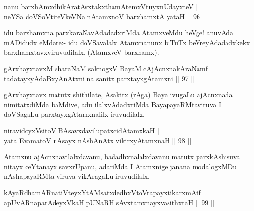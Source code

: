 \begin{shl}
nanu barxhAmxdhikAratAvxtakxthamAtemxVtuyxnUdayxteV |\\
neYSa doVSoV\s tireVkeVNa nA\s \s tamxnoV barxhamxtA yataH \hfill || 96 ||
\end{shl}


\begin{artha}%
idu barxhamxna parxkaraNavAdadadxriMda AtamxveMdu heVge! anuvAda mADidudx eMdare:- idu doVSavalalx Atamxnanunx biTuTx beVreyAdadadxkekx barxhamxtavxviruvudilalx, (AtamxveV barxhamx).
\end{artha}


\begin{shl}
gArxhayxtavxM sharaNaM saknogxV BayaM cAjAcnxnakAraNamf |\\
tadatayxyAdaBxyAnAtxni na sanitx parxtayxgAtamxni \hfill || 97 ||
\end{shl}

\begin{artha}
gArxhayxtavx matutx shithilate, Asakitx (rAga) Baya ivugaLu ajAcnxnada nimitatxdiMda baMdive, adu ilalxvAdadxriMda BayapayaRMtaviruva I doVSagaLu parxtayxgAtamxnalilx iruvudilalx.
\end{artha}


\begin{shl}
niravidoyxV\s \footnotemark[1]{}sitoV BAsavxdavilupatxcidAtamxkaH |\\
yata EvamatoV nAsayx nAshAnAtx vikirxyA\s \s tamxnaH \hfill || 98 ||
\end{shl}

\begin{artha}
Atamxnu ajAcnxnavilalxdavanu, badadhxnalalxdavanu matutx parxkAshisuva nitayx ceYtanayx savxrUpanu, adariMda I Atamxnige janana modalogxMDu nAshapayaRMta viruva vikAragaLu iruvudilalx.
\end{artha}


\begin{shl}
kAyaRdhamARnatiVteyxYtAMsatxdedhxVtoVrapayxtikarxmAtf |\\
apUvARnaparAdeyxVkaH pUNaRH sAvxtamxnayxvasithxtaH \hfill || 99 ||
\end{shl}

